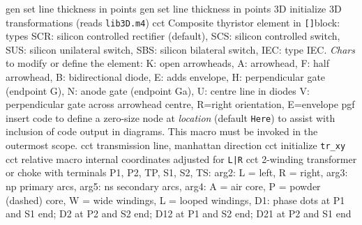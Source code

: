   {gen}
  {set line thickness in points}
  {gen}
  {set line thickness in points}
  {3D}
  {initialize 3D transformations (reads {\tt lib3D.m4})}
  {cct}
  {Composite thyristor element in {\tt []}block:
   types
                                   SCR: silicon controlled rectifier (default),
                                   SCS: silicon controlled switch,
                                   SUS: silicon unilateral switch,
                                   SBS: silicon bilateral switch,
                                   IEC: type IEC.
   {\sl Chars} to modify or define the element:
                                   K: open arrowheads,
                                   A: arrowhead,
                                   F: half arrowhead,
                                   B: bidirectional diode,
                                   E: adds envelope,
                                   H: perpendicular gate (endpoint G),
                                   N: anode gate (endpoint Ga),
                                   U: centre line in diodes
                                 V: perpendicular gate across arrowhead centre,
                                   R=right orientation,
                                   E=envelope
    }
  {pgf}
  {insert \Tikz code to define a zero-size \Tikz node at {\sl location}
    (default {\tt Here}) to assist with inclusion of \pic code output in
    \Tikz diagrams.  This macro must be invoked in the outermost \pic scope.
    }
  {cct}
  {transmission line, manhattan direction}
  {cct}
  {initialize {\tt tr\_xy}}
  {cct}
  {relative macro internal coordinates adjusted for {\tt L|R}}
  {cct}
  {2-winding transformer or choke with terminals P1, P2, TP, S1, S2, TS:
    arg2: L = left, R = right,
    arg3: np primary arcs,
    arg5: ns secondary arcs,
    arg4: A = air core, P = powder (dashed) core,
    W = wide windings, L = looped windings,
    D1: phase dots at P1 and S1 end; D2 at P2 and S2 end; D12 at P1 and S2 end;
    D21 at P2 and S1 end 
   }
